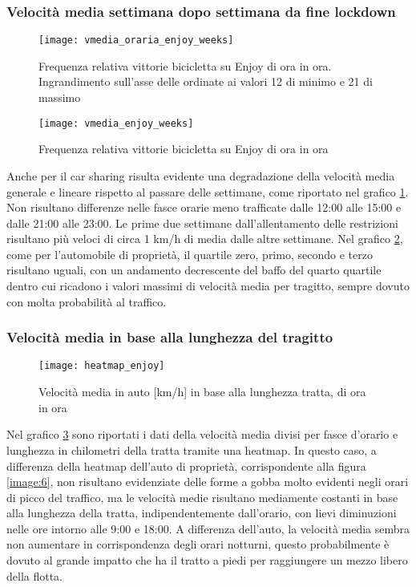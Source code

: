 \subsubsection{Velocità media settimana dopo settimana da fine lockdown}

\begin{figure}[H]
	\texttt{[image: vmedia\_oraria\_enjoy\_weeks]}
	\caption{Frequenza relativa vittorie bicicletta su Enjoy di ora in ora. Ingrandimento sull'asse delle ordinate ai valori 12 di minimo e 21 di massimo}
	\label{image:16}
\end{figure}

\begin{figure}[H]
	\texttt{[image: vmedia\_enjoy\_weeks]}
	\caption{Frequenza relativa vittorie bicicletta su Enjoy di ora in ora}
	\label{image:28}
\end{figure}

Anche per il car sharing risulta evidente una degradazione della velocità media generale e lineare rispetto al passare delle settimane, come riportato nel grafico \ref{image:16}. Non risultano differenze nelle fasce orarie meno trafficate dalle 12:00 alle 15:00 e dalle 21:00 alle 23:00. Le prime due settimane dall'allentamento delle restrizioni risultano più veloci di circa 1 km/h di media dalle altre settimane. Nel grafico \ref{image:28}, come per l'automobile di proprietà, il quartile zero, primo, secondo e terzo risultano uguali, con un andamento decrescente del baffo del quarto quartile dentro cui ricadono i valori massimi di velocità media per tragitto, sempre dovuto con molta probabilità al traffico.

\subsubsection{Velocità media in base alla lunghezza del tragitto}

\begin{figure}[H]
	\texttt{[image: heatmap\_enjoy]}
	\caption{Velocità media in auto [km/h] in base alla lunghezza tratta, di ora in ora}
	\label{image:30}
\end{figure}

Nel grafico \ref{image:30} sono riportati i dati della velocità media divisi per fasce d'orario e lunghezza in chilometri della tratta tramite una heatmap. In questo caso, a differenza della heatmap dell'auto di proprietà, corrispondente alla figura \ref{image:6}, non risultano evidenziate delle forme a gobba molto evidenti negli orari di picco del traffico, ma le velocità medie risultano mediamente costanti in base alla lunghezza della tratta, indipendentemente dall'orario, con lievi diminuzioni nelle ore intorno alle 9:00 e 18:00. A differenza dell'auto, la velocità media sembra non aumentare in corrispondenza degli orari notturni, questo probabilmente è dovuto al grande impatto che ha il tratto a piedi per raggiungere un mezzo libero della flotta.

